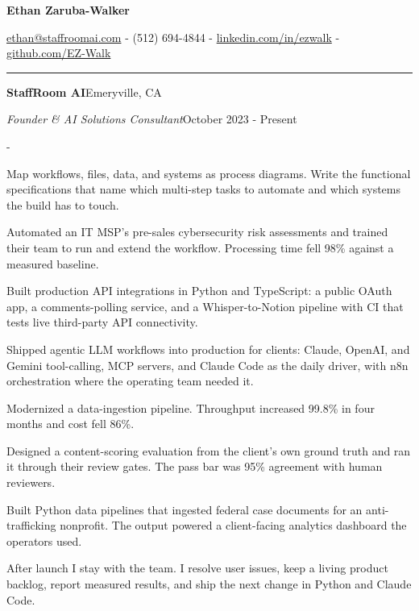 \documentclass[10pt,letterpaper]{article}
\newenvironment{cvitems}{%
  \begin{list}{-}{%
    \setlength{\leftmargin}{12pt}%
    \setlength{\itemsep}{1.2pt}%
    \setlength{\parsep}{0pt}%
    \setlength{\topsep}{1.5pt}%
    \setlength{\partopsep}{0pt}%
    \setlength{\labelwidth}{6pt}%
    \setlength{\labelsep}{6pt}%
    \setlength{\itemindent}{0pt}%
  }%
}{\end{list}}
\newcommand{\cvsection}[1]{%
  \vspace{7pt}%
  \noindent{\bfseries\fontsize{11pt}{13pt}\selectfont\MakeUppercase{#1}}\par
  \vspace{1pt}%
  \noindent\rule{\textwidth}{0.4pt}\par
  \vspace{4pt}%
}
\newcommand{\cventryhead}[4]{%
  \noindent\textbf{#1}\hfill#2\par
  \vspace{0.5pt}%
  \noindent\textit{#3}\hfill#4\par
}
\begin{document}
\begin{center}
  {\bfseries\fontsize{22pt}{24pt}\selectfont Ethan Zaruba-Walker\par}
  \vspace{4pt}
  {\fontsize{10pt}{12pt}\selectfont
    \href{mailto:ethan@staffroomai.com}{ethan@staffroomai.com}
    {-}
    (512) 694-4844
    {-}
    \href{https://linkedin.com/in/ezwalk}{linkedin.com/in/ezwalk}
    {-}
    \href{https://github.com/EZ-Walk}{github.com/EZ-Walk}\par}
\end{center}
\vspace{2pt}

\cvsection{Experience}

\cventryhead{StaffRoom AI}{Emeryville, CA}
{Founder \& AI Solutions Consultant}{October 2023 - Present}
\begin{cvitems}
  \item Map workflows, files, data, and systems as process diagrams. Write the functional specifications that name which multi-step tasks to automate and which systems the build has to touch.
  \item Automated an IT MSP's pre-sales cybersecurity risk assessments and trained their team to run and extend the workflow. Processing time fell 98\% against a measured baseline.
  \item Built production API integrations in Python and TypeScript: a public OAuth app, a comments-polling service, and a Whisper-to-Notion pipeline with CI that tests live third-party API connectivity.
  \item Shipped agentic LLM workflows into production for clients: Claude, OpenAI, and Gemini tool-calling, MCP servers, and Claude Code as the daily driver, with n8n orchestration where the operating team needed it.
  \item Modernized a data-ingestion pipeline. Throughput increased 99.8\% in four months and cost fell 86\%.
  \item Designed a content-scoring evaluation from the client's own ground truth and ran it through their review gates. The pass bar was 95\% agreement with human reviewers.
  \item Built Python data pipelines that ingested federal case documents for an anti-trafficking nonprofit. The output powered a client-facing analytics dashboard the operators used.
  \item After launch I stay with the team. I resolve user issues, keep a living product backlog, report measured results, and ship the next change in Python and Claude Code.
\end{cvitems}
\end{document}
